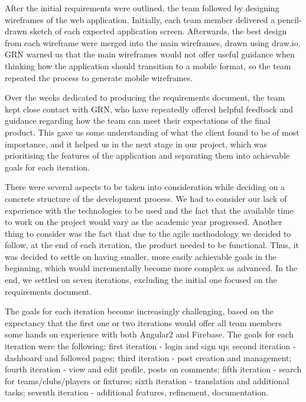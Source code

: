\documentclass{l3proj}
\begin{document}
After the initial requirements were outlined, the team followed by designing wireframes of the web application. Initially, each team member delivered a pencil-drawn sketch of each expected application screen. Afterwards, the best design from each wireframe were merged into the main wireframes, drawn using draw.io. GRN warned us that the main wireframes would not offer useful guidance when thinking how the application should transition to a mobile format, so the team repeated the process to generate mobile wireframes.

Over the weeks dedicated to producing the requirements document, the team kept close contact with GRN, who have repeatedly offered helpful feedback and guidance regarding how the team can meet their expectations of the final product. This gave us some understanding of what the client found to be of most importance, and it helped us in the next stage in our project, which was prioritising the features of the application and separating them into achievable goals for each iteration.

There were several aspects to be taken into consideration while deciding on a concrete structure of the development process. We had to consider our lack of experience with the technologies to be used and the fact that the available time to work on the project would vary as the academic year progressed. Another thing to consider was the fact that due to the agile methodology we decided to follow, at the end of each iteration, the product needed to be functional. Thus, it was decided to settle on having smaller, more easily achievable goals in the beginning, which would incrementally become more complex as advanced. In the end, we settled on seven iterations, excluding the initial one focused on the requirements document.


The goals for each iteration become increasingly challenging, based on the expectancy that the first one or two iterations would offer all team members some hands on experience with both Angular2 and Firebase. The goals for each iteration were the following: first iteration - login and sign up; second iteration - dashboard and followed pages; third iteration - post creation and management; fourth iteration - view and edit profile, posts on comments; fifth iteration - search for teams/clubs/players or fixtures; sixth iteration - translation and additional tasks; seventh iteration - additional features, refinement, documentation.


\end{document}
